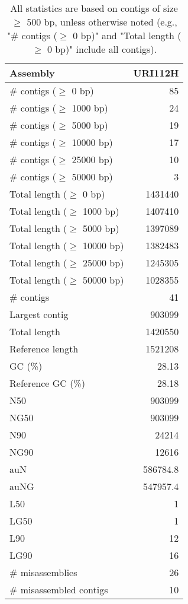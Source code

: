 \documentclass[12pt,a4paper]{article}
\begin{document}
\begin{table}[ht]
\begin{center}
\caption{All statistics are based on contigs of size $\geq$ 500 bp, unless otherwise noted (e.g., "\# contigs ($\geq$ 0 bp)" and "Total length ($\geq$ 0 bp)" include all contigs).}
\begin{tabular}{|l*{1}{|r}|}
\hline
Assembly & URI112H \\ \hline
\# contigs ($\geq$ 0 bp) & 85 \\ \hline
\# contigs ($\geq$ 1000 bp) & 24 \\ \hline
\# contigs ($\geq$ 5000 bp) & 19 \\ \hline
\# contigs ($\geq$ 10000 bp) & 17 \\ \hline
\# contigs ($\geq$ 25000 bp) & 10 \\ \hline
\# contigs ($\geq$ 50000 bp) & 3 \\ \hline
Total length ($\geq$ 0 bp) & 1431440 \\ \hline
Total length ($\geq$ 1000 bp) & 1407410 \\ \hline
Total length ($\geq$ 5000 bp) & 1397089 \\ \hline
Total length ($\geq$ 10000 bp) & 1382483 \\ \hline
Total length ($\geq$ 25000 bp) & 1245305 \\ \hline
Total length ($\geq$ 50000 bp) & 1028355 \\ \hline
\# contigs & 41 \\ \hline
Largest contig & 903099 \\ \hline
Total length & 1420550 \\ \hline
Reference length & 1521208 \\ \hline
GC (\%) & 28.13 \\ \hline
Reference GC (\%) & 28.18 \\ \hline
N50 & 903099 \\ \hline
NG50 & 903099 \\ \hline
N90 & 24214 \\ \hline
NG90 & 12616 \\ \hline
auN & 586784.8 \\ \hline
auNG & 547957.4 \\ \hline
L50 & 1 \\ \hline
LG50 & 1 \\ \hline
L90 & 12 \\ \hline
LG90 & 16 \\ \hline
\# misassemblies & 26 \\ \hline
\# misassembled contigs & 10 \\ \hline

\end{tabular}
\end{center}
\end{table}
\end{document}
